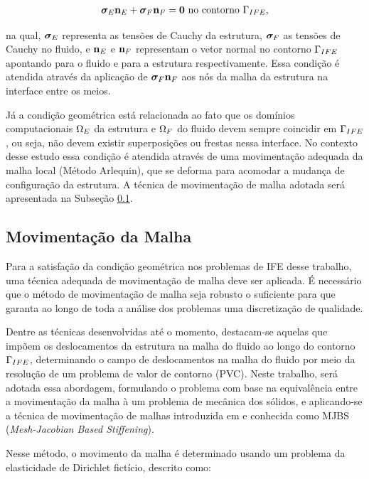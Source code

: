 \documentclass[tese_patricia]{subfiles}
\begin{document}
\begin{align}
	\stressTensorS \snormalS + \stressTensorF \snormalF = \vzero \ \textrm{no contorno} \ \boundaryFSI,
\end{align}

\noindent na qual, $\boldsymbol{\sigma}_{E}$ representa as tensões de Cauchy da estrutura, $\boldsymbol{\sigma}_{F}$ as tensões de Cauchy no fluido, e $\mathbf{n}_{E}$ e $\mathbf{n}_{F}$ representam o vetor normal no contorno $\Gamma_{IFE}$ apontando para o fluido e para a estrutura respectivamente. Essa condição é atendida através da aplicação de $\boldsymbol{\sigma}_{F} \mathbf{n}_{F}$ aos nós da malha da estrutura na interface entre os meios.

Já a condição geométrica está relacionada ao fato que os domínios computacionais $\Omega_{E}$ da estrutura e $\Omega_{F}$ do fluido devem sempre coincidir em $\Gamma_{IFE}$, ou seja, não devem existir superposições ou frestas nessa interface. No contexto desse estudo essa condição é atendida através de uma movimentação adequada da malha local (Método Arlequin), que se deforma para acomodar a mudança de configuração da estrutura. A técnica de movimentação de malha adotada será apresentada na Subseção \ref{capitulo:Cap7:CondAcop:MovMalha}.

\subsection{Movimentação da Malha} \label{capitulo:Cap7:CondAcop:MovMalha}

Para a satisfação da condição geométrica nos problemas de IFE desse trabalho, uma técnica adequada de movimentação de malha deve ser aplicada. É necessário que o método de movimentação de malha seja robusto o suficiente para que garanta ao longo de toda a análise dos problemas uma discretização de qualidade.

Dentre as técnicas desenvolvidas até o momento, destacam-se aquelas que impõem os deslocamentos da estrutura na malha do fluido ao longo do contorno $\Gamma_{IFE}$, determinando o campo de deslocamentos na malha do fluido por meio da resolução de um problema de valor de contorno (PVC). Neste trabalho, será adotada essa abordagem, formulando o problema com base na equivalência entre a movimentação da malha à um problema de mecânica dos sólidos, e aplicando-se a técnica de movimentação de malhas introduzida em  e  conhecida como MJBS (\textit{Mesh-Jacobian Based Stiffening}).

Nesse método, o movimento da malha é determinado usando um problema da elasticidade de Dirichlet fictício, descrito como:
\end{document}

